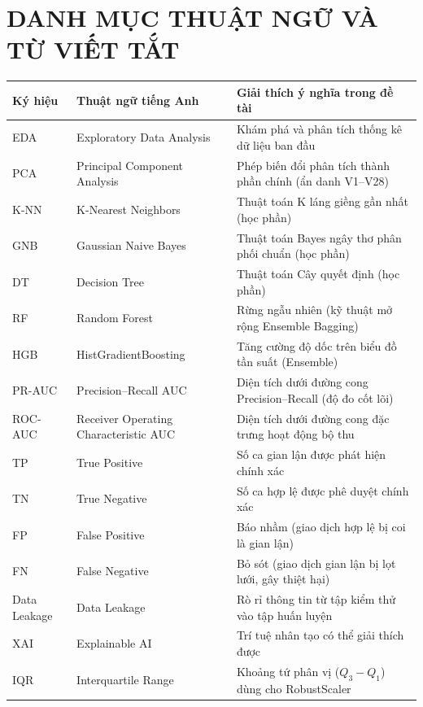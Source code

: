 \documentclass[13pt,a4paper]{extarticle}
\begin{document}
\tableofcontents
\newpage

\listoffigures
\vspace{0.8cm}
\listoftables
\newpage

\section*{DANH MỤC THUẬT NGỮ VÀ TỪ VIẾT TẮT}
\begin{table}[H]
\centering
\begin{tabular}{|l|l|p{8.5cm}|}
\hline
\textbf{Ký hiệu} & \textbf{Thuật ngữ tiếng Anh} & \textbf{Giải thích ý nghĩa trong đề tài} \\ \hline
EDA & Exploratory Data Analysis & Khám phá và phân tích thống kê dữ liệu ban đầu \\ \hline
PCA & Principal Component Analysis & Phép biến đổi phân tích thành phần chính (ẩn danh V1--V28) \\ \hline
K-NN & K-Nearest Neighbors & Thuật toán K láng giềng gần nhất (học phần) \\ \hline
GNB & Gaussian Naive Bayes & Thuật toán Bayes ngây thơ phân phối chuẩn (học phần) \\ \hline
DT & Decision Tree & Thuật toán Cây quyết định (học phần) \\ \hline
RF & Random Forest & Rừng ngẫu nhiên (kỹ thuật mở rộng Ensemble Bagging) \\ \hline
HGB & HistGradientBoosting & Tăng cường độ dốc trên biểu đồ tần suất (Ensemble) \\ \hline
PR-AUC & Precision--Recall AUC & Diện tích dưới đường cong Precision--Recall (độ đo cốt lõi) \\ \hline
ROC-AUC & Receiver Operating Characteristic AUC & Diện tích dưới đường cong đặc trưng hoạt động bộ thu \\ \hline
TP & True Positive & Số ca gian lận được phát hiện chính xác \\ \hline
TN & True Negative & Số ca hợp lệ được phê duyệt chính xác \\ \hline
FP & False Positive & Báo nhầm (giao dịch hợp lệ bị coi là gian lận) \\ \hline
FN & False Negative & Bỏ sót (giao dịch gian lận bị lọt lưới, gây thiệt hại) \\ \hline
Data Leakage & Data Leakage & Rò rỉ thông tin từ tập kiểm thử vào tập huấn luyện \\ \hline
XAI & Explainable AI & Trí tuệ nhân tạo có thể giải thích được \\ \hline
IQR & Interquartile Range & Khoảng tứ phân vị ($Q_3 - Q_1$) dùng cho RobustScaler \\ \hline
\end{tabular}
\end{table}
\newpage
\end{document}
